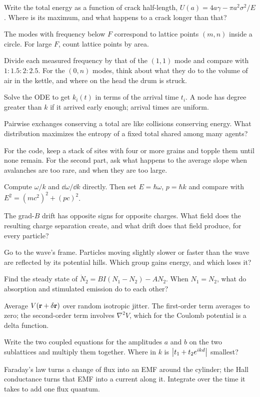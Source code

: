 
 Write the total energy as a function of crack half-length, $U(a) = 4a\gamma - \pi a^2\sigma^2/E$. Where is its maximum, and what happens to a crack longer than that?

 The modes with frequency below $F$ correspond to lattice points $(m,n)$ inside a circle. For large $F$, count lattice points by area.

 Divide each measured frequency by that of the $(1,1)$ mode and compare with $1:1.5:2:2.5$. For the $(0,n)$ modes, think about what they do to the volume of air in the kettle, and where on the head the drum is struck.


 Solve the ODE to get $k_i(t)$ in terms of the arrival time $t_i$. A node has degree greater than $k$ if it arrived early enough; arrival times are uniform.

 Pairwise exchanges conserving a total are like collisions conserving energy. What distribution maximizes the entropy of a fixed total shared among many agents?

 For the code, keep a stack of sites with four or more grains and topple them until none remain. For the second part, ask what happens to the average slope when avalanches are too rare, and when they are too large.


 Compute $\omega/k$ and $\dd\omega/\dd k$ directly. Then set $E = \hbar\omega$, $p = \hbar k$ and compare with $E^2 = (mc^2)^2 + (pc)^2$.

 The grad-$B$ drift has opposite signs for opposite charges. What field does the resulting charge separation create, and what drift does that field produce, for every particle?

 Go to the wave's frame. Particles moving slightly slower or faster than the wave are reflected by its potential hills. Which group gains energy, and which loses it?


 Find the steady state of $\dot N_2 = BI(N_1-N_2) - AN_2$. When $N_1 = N_2$, what do absorption and stimulated emission do to each other?

 Average $V(\mathbf{r}+\delta\mathbf{r})$ over random isotropic jitter. The first-order term averages to zero; the second-order term involves $\nabla^2V$, which for the Coulomb potential is a delta function.


 Write the two coupled equations for the amplitudes $a$ and $b$ on the two sublattices and multiply them together. Where in $k$ is $\left\lvert t_1+t_2e^{ikd}\right\rvert$ smallest?

 Faraday's law turns a change of flux into an EMF around the cylinder; the Hall conductance turns that EMF into a current along it. Integrate over the time it takes to add one flux quantum.
